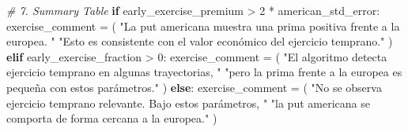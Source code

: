 \documentclass[
  11pt,
]{article}
\newenvironment{Shaded}{}{}
\newcommand{\CommentTok}[1]{\textcolor[rgb]{0.38,0.63,0.69}{\textit{#1}}}
\newcommand{\ControlFlowTok}[1]{\textcolor[rgb]{0.00,0.44,0.13}{\textbf{#1}}}
\newcommand{\DecValTok}[1]{\textcolor[rgb]{0.25,0.63,0.44}{#1}}
\newcommand{\NormalTok}[1]{#1}
\newcommand{\OperatorTok}[1]{\textcolor[rgb]{0.40,0.40,0.40}{#1}}
\newcommand{\StringTok}[1]{\textcolor[rgb]{0.25,0.44,0.63}{#1}}
\begin{document}
\begin{Shaded}
\begin{Highlighting}[]
\CommentTok{\# 7. Summary Table}
\ControlFlowTok{if}\NormalTok{ early\_exercise\_premium }\OperatorTok{\textgreater{}} \DecValTok{2} \OperatorTok{*}\NormalTok{ american\_std\_error:}
\NormalTok{    exercise\_comment }\OperatorTok{=}\NormalTok{ (}
        \StringTok{"La put americana muestra una prima positiva frente a la europea. "}
        \StringTok{"Esto es consistente con el valor económico del ejercicio temprano."}
\NormalTok{    )}
\ControlFlowTok{elif}\NormalTok{ early\_exercise\_fraction }\OperatorTok{\textgreater{}} \DecValTok{0}\NormalTok{:}
\NormalTok{    exercise\_comment }\OperatorTok{=}\NormalTok{ (}
        \StringTok{"El algoritmo detecta ejercicio temprano en algunas trayectorias, "}
        \StringTok{"pero la prima frente a la europea es pequeña con estos parámetros."}
\NormalTok{    )}
\ControlFlowTok{else}\NormalTok{:}
\NormalTok{    exercise\_comment }\OperatorTok{=}\NormalTok{ (}
        \StringTok{"No se observa ejercicio temprano relevante. Bajo estos parámetros, "}
        \StringTok{"la put americana se comporta de forma cercana a la europea."}
\NormalTok{    )}


\end{Highlighting}
\end{Shaded}
\end{document}
